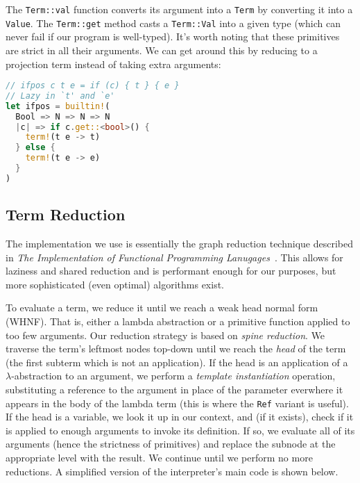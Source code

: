 The \texttt{Term::val} function converts its argument into a \texttt{Term} by converting it into a \texttt{Value}. The \texttt{Term::get} method casts a \texttt{Term::Val} into a given type (which can never fail if our program is well-typed). It's worth noting that these primitives are strict in all their arguments. We can get around this by reducing to a projection term instead of taking extra arguments:

\begin{lstlisting}[language=rust]
// ifpos c t e = if (c) { t } { e }
// Lazy in `t' and `e' 
let ifpos = builtin!(
  Bool => N => N => N 
  |c| => if c.get::<bool>() {
    term!(t e -> t)
  } else {
    term!(t e -> e)
  }
)
\end{lstlisting}

\subsection{Term Reduction}

The implementation we use is essentially the graph reduction technique described in \textit{The Implementation of Functional Programming Lanugages}~\cite{SLPJ}. This allows for laziness and shared reduction and is performant enough for our purposes, but more sophisticated (even optimal) algorithms exist.

To evaluate a term, we reduce it until we reach a weak head normal form (WHNF). That is, either a lambda abstraction or a primitive function applied to too few arguments. Our reduction strategy is based on \textit{spine reduction}. We traverse the term's leftmost nodes top-down until we reach the \textit{head} of the term (the first subterm which is not an application). If the head is an application of a $\lambda$-abstraction to an argument, we perform a \textit{template instantiation} operation, substituting a reference to the argument in place of the parameter everwhere it appears in the body of the lambda term (this is where the \texttt{Ref} variant is useful). If the head is a variable, we look it up in our context, and (if it exists), check if it is applied to enough arguments to invoke its definition. If so, we evaluate all of its arguments (hence the strictness of primitives) and replace the subnode at the appropriate level with the result. We continue until we perform no more reductions. A simplified version of the interpreter's main code is shown below.


